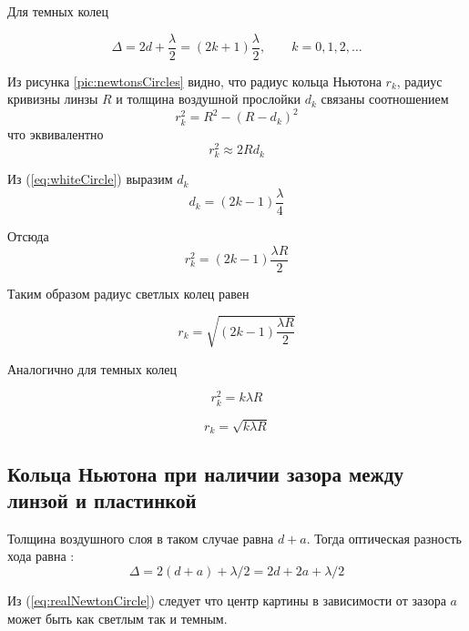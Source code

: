 \documentclass[14pt, a4paper, twoside]{extreport}
\begin{document}
Для темных колец

\begin{equation}
  \Delta = 2d + \frac{\lambda}{2} = (2k+1)\frac{\lambda}{2}, \qquad k=0,1,2,\dots
  \label{eq:blackCircle}
\end{equation}

Из рисунка \ref{pic:newtonsCircles} видно, что радиус кольца Ньютона $r_k$, радиус кривизны линзы $R$ и толщина воздушной прослойки $d_k$ связаны соотношением
\begin{equation}
  r_k^2 = R^2 - (R - d_k)^2
\end{equation}
что эквивалентно
\begin{equation}
  r_k^2 \approx 2Rd_k
  \label{eq:circleRadius}
\end{equation}

Из (\ref{eq:whiteCircle}) выразим $d_k$
\begin{equation}
  d_k = (2k - 1) \frac{\lambda}{4}
\end{equation}

Отсюда
\begin{equation}
  r_k^2 = (2k -1)\frac{\lambda R}{2}
\end{equation}

Таким образом радиус светлых колец равен

\begin{equation}
  r_k = \sqrt{(2k -1)\frac{\lambda R}{2}}
\end{equation}

Аналогично для темных колец

\begin{equation}
  r_k^2 = k\lambda R
\end{equation}

\begin{equation}
  r_k = \sqrt{k\lambda R}
\end{equation}

\subsection{Кольца Ньютона при наличии зазора между линзой и пластинкой}

Толщина воздушного слоя в таком случае равна $d + a$. Тогда оптическая разность хода равна :
\begin{equation}
  \Delta = 2(d + a) + \lambda/2 = 2d + 2a + \lambda/2
  \label{eq:realNewtonCircle}
\end{equation}

Из (\ref{eq:realNewtonCircle}) следует что центр картины  в зависимости от зазора $a$ может быть как светлым так и темным.
\end{document}
